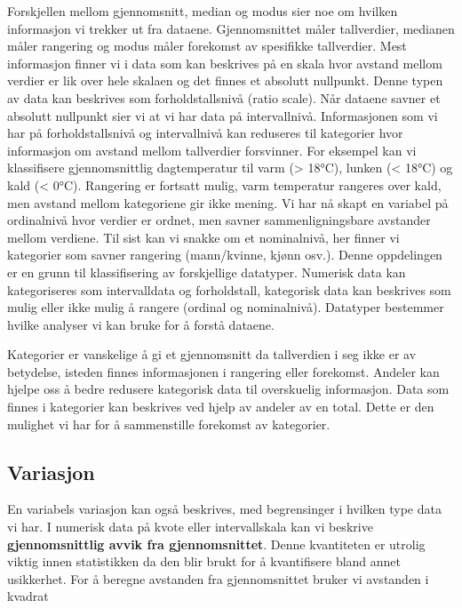 \documentclass[
  letterpaper,
  DIV=11,
  numbers=noendperiod,
  oneside]{scrreprt}
\begin{document}
Forskjellen mellom gjennomsnitt, median og modus sier noe om hvilken
informasjon vi trekker ut fra dataene. Gjennomsnittet måler tallverdier,
medianen måler rangering og modus måler forekomst av spesifikke
tallverdier. Mest informasjon finner vi i data som kan beskrives på en
skala hvor avstand mellom verdier er lik over hele skalaen og det finnes
et absolutt nullpunkt. Denne typen av data kan beskrives som
forholdstallsnivå (ratio scale). Når dataene savner et absolutt
nullpunkt sier vi at vi har data på intervallnivå. Informasjonen som vi
har på forholdstallsnivå og intervallnivå kan reduseres til kategorier
hvor informasjon om avstand mellom tallverdier forsvinner. For eksempel
kan vi klassifisere gjennomsnittlig dagtemperatur til varm
(\textgreater{} 18°C), lunken (\textless{} 18°C) og kald (\textless{}
0°C). Rangering er fortsatt mulig, varm temperatur rangeres over kald,
men avstand mellom kategoriene gir ikke mening. Vi har nå skapt en
variabel på ordinalnivå hvor verdier er ordnet, men savner
sammenligningsbare avstander mellom verdiene. Til sist kan vi snakke om
et nominalnivå, her finner vi kategorier som savner rangering
(mann/kvinne, kjønn osv.). Denne oppdelingen er en grunn til
klassifisering av forskjellige datatyper. Numerisk data kan
kategoriseres som intervalldata og forholdstall, kategorisk data kan
beskrives som mulig eller ikke mulig å rangere (ordinal og nominalnivå).
Datatyper bestemmer hvilke analyser vi kan bruke for å forstå dataene.

Kategorier er vanskelige å gi et gjennomsnitt da tallverdien i seg ikke
er av betydelse, isteden finnes informasjonen i rangering eller
forekomst. Andeler kan hjelpe oss å bedre redusere kategorisk data til
overskuelig informasjon. Data som finnes i kategorier kan beskrives ved
hjelp av andeler av en total. Dette er den mulighet vi har for å
sammenstille forekomst av kategorier.

\hypertarget{variasjon}{%
\subsection{Variasjon}\label{variasjon}}

En variabels variasjon kan også beskrives, med begrensinger i hvilken
type data vi har. I numerisk data på kvote eller intervallskala kan vi
beskrive \textbf{gjennomsnittlig avvik fra gjennomsnittet}. Denne
kvantiteten er utrolig viktig innen statistikken da den blir brukt for å
kvantifisere bland annet usikkerhet. For å beregne avstanden fra
gjennomsnittet bruker vi avstanden i kvadrat
\end{document}
